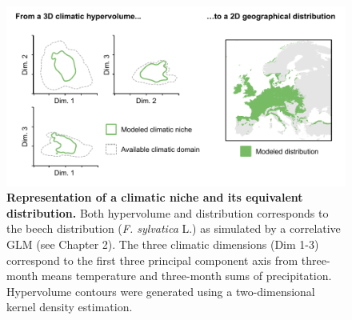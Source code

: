 \begin{figure}
\hspace*{-0.8cm}
\centering
\includegraphics{0introduction/figs/glm_niche.pdf}
\caption{\textbf{Representation of a climatic niche and its equivalent distribution.} Both hypervolume and distribution corresponds to the beech distribution (\emph{F. sylvatica} L.) as simulated by a correlative GLM (see Chapter 2). The three climatic dimensions (Dim 1-3) correspond to the first three principal component axis from three-month means temperature and three-month sums of precipitation. Hypervolume contours were generated using a two-dimensional kernel density estimation.}
\label{fig:glmniche}
\end{figure}

\clearpage

